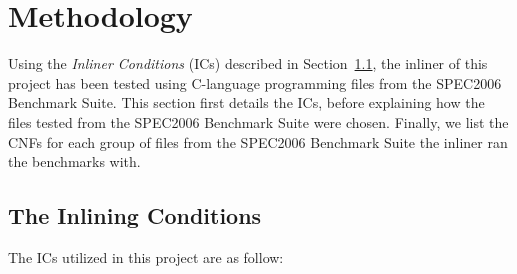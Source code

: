 
\clearpage
\section{Methodology}
\label{sec:methodology}

Using the \textit{Inliner Conditions} (ICs) described in
Section~\ref{sub:meth:inlining_conditions}, the inliner of this project has been
tested using C-language programming files from the SPEC2006 Benchmark Suite.
This section first details the ICs, before explaining how the files tested from
the SPEC2006 Benchmark Suite were chosen. Finally, we list the CNFs for each
group of files from the SPEC2006 Benchmark Suite the inliner ran the benchmarks
with.

\subsection{The Inlining Conditions}
\label{sub:meth:inlining_conditions}

The ICs utilized in this project are as follow:

